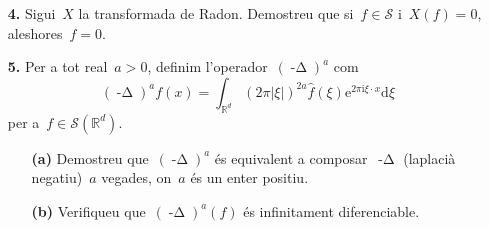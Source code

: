 \documentclass[a4paper]{article}
\theoremstyle{plain}
\theoremstyle{definition}
\newcommand{\iu}{\mathrm{i}}
\newcommand{\e}{\mathrm{e}}
\providecommand{\uppi}{\pi}
\newcommand{\diff}{\mathrm{d}}
\newcommand{\abs}[1]{\lvert{#1}\rvert}
\newcommand{\Sc}{\mathcal{S}}
\newcommand{\RR}{\mathbb{R}}
\DeclareMathOperator{\mlap}{-\Delta}
\begin{document}
\begin{enumerate}
    \item[\textbf{4.}] Sigui~\(X\) la transformada de Radon. Demostreu que
        si~\(f\in\Sc\) i~\(X(f)=0\), aleshores~\(f=0\).
\end{enumerate}

\begin{enumerate}
    \item[\textbf{5.}] Per a tot real~\(a>0\), definim
        l'operador~\((\mlap)^{a}\) com
        \[
            (\mlap)^{a}f(x)
            =
            \int_{\RR^{d}}
            (2\uppi\abs{\xi})^{2a}
            \widehat{f}(\xi)
            \e^{2\uppi\iu\xi\cdot x}
            \diff\xi
        \]
        per a~\(f\in\Sc(\RR^{d})\).
        \begin{enumerate}
            \item[\textbf{(a)}] Demostreu que~\((\mlap)^{a}\) és equivalent a
                composar~\(\mlap\) (laplacià negatiu)~\(a\) vegades, on~\(a\)
                és un enter positiu.
        \end{enumerate}
\end{enumerate}

\begin{enumerate}
    \item[]\begin{enumerate}
        \item[\textbf{(b)}] Verifiqueu que~\((\mlap)^{a}(f)\) és infinitament
            diferenciable.
    \end{enumerate}
\end{enumerate}
\end{document}
